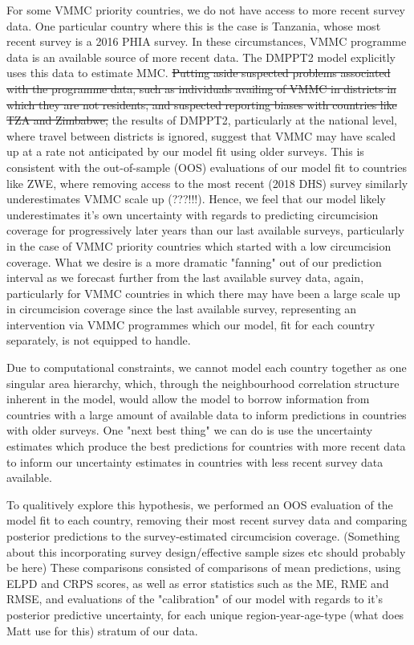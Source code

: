 \documentclass{article}
\begin{document}
For some VMMC priority countries, we do not have access to more recent survey data. 
One particular country where this is the case is Tanzania, whose most recent survey is a 2016 PHIA survey.
In these circumstances, VMMC programme data is an available source of more recent data.
The DMPPT2 model explicitly uses this data to estimate MMC. 
\sout{Putting aside suspected problems associated with the programme data, such as individuals availing of VMMC in districts in which they are not residents, and suspected reporting biases with countries like TZA and Zimbabwe,} the results of DMPPT2, particularly at the national level, where travel between districts is ignored, suggest that VMMC may have scaled up at a rate not anticipated by our
model fit using older surveys.
This is consistent with the out-of-sample (OOS) evaluations of our model fit to countries like ZWE, where removing access to the most recent (2018 DHS) survey similarly
underestimates VMMC scale up (???!!!).
Hence, we feel that our model likely underestimates it's own uncertainty with regards to predicting circumcision coverage for progressively later years than our last
available surveys, particularly in the case of VMMC priority countries which started with a low circumcision coverage. What we desire is a more dramatic "fanning" out of
our prediction interval as we forecast further from the last available survey data, again, particularly for VMMC countries in which there may have been a large scale up
in circumcision coverage since the last available survey, representing an intervention via VMMC programmes which our model, fit for each country separately, is not equipped to
handle.

Due to computational constraints, we cannot model each country together as one singular area hierarchy, which, through the neighbourhood correlation structure inherent in the model,
would allow the model to borrow information from countries with a large amount of available data to inform predictions in countries with older surveys.
One "next best thing" we can do is use the uncertainty estimates which produce the best predictions for countries with more recent data to inform our uncertainty estimates in countries
with less recent survey data available. 

To qualitively explore this hypothesis, we performed an OOS evaluation of the model fit to each country, removing their most recent survey data and comparing posterior predictions
to the survey-estimated circumcision coverage. 
(Something about this incorporating survey design/effective sample sizes etc should probably be here)
These comparisons consisted of comparisons of mean predictions, using ELPD and CRPS scores, as well as error statistics such as the ME, RME and RMSE, and evaluations of the
"calibration" of our model with regards to it's posterior predictive uncertainty, for each unique region-year-age-type (what does Matt use for this) stratum of our data. 
\end{document}
